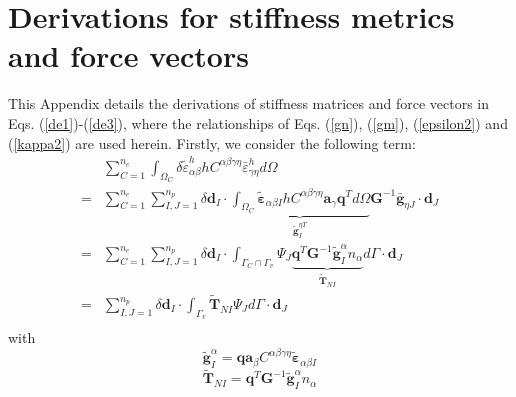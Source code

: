 \section{Derivations for stiffness metrics and force vectors}
This Appendix details the derivations of stiffness matrices and force vectors in Eqs. (\ref{de1})-(\ref{de3}), where the relationships of Eqs. (\ref{gn}), (\ref{gm}), (\ref{epsilon2}) and (\ref{kappa2}) are used herein. Firstly, we consider the following term:
\begin{equation}
\begin{split}
&\sum_{C=1}^{n_e}\int_{\Omega_C} \delta \tilde \varepsilon_{\alpha\beta}^h hC^{\alpha\beta\gamma\eta}\bar \varepsilon^h_{\gamma\eta} d\Omega \\
        =&\sum_{C=1}^{n_e}\sum_{I,J=1}^{n_p}\delta \boldsymbol d_I \cdot \underbrace{\int_{\Omega_C} \tilde{\boldsymbol \varepsilon}_{\alpha\beta I} hC^{\alpha\beta\gamma\eta} \boldsymbol a_\gamma \boldsymbol q^T d\Omega}_{\tilde{\boldsymbol g}^{\eta T}_I} \boldsymbol G^{-1} \bar{\boldsymbol g}_{\eta J} \cdot \boldsymbol d_J \\
        =&\sum_{C=1}^{n_e}\sum_{I,J=1}^{n_p}\delta \boldsymbol d_I \cdot \int_{\Gamma_C\cap\Gamma_v} \Psi_J \underbrace{\boldsymbol q^T \boldsymbol G^{-1}\tilde{\boldsymbol g}^\alpha_I
        n_\alpha}_{\tilde{\boldsymbol T}_{NI}} d\Gamma
       \cdot \boldsymbol d_J \\
        =&\sum_{I,J=1}^{n_p}\delta \boldsymbol d_I \cdot \int_{\Gamma_v} \tilde{\boldsymbol T}_{NI}\Psi_J d\Gamma
       \cdot \boldsymbol d_J \\
\end{split}
\end{equation}
with
\begin{equation}
        \tilde{\boldsymbol g}^\alpha_I = \boldsymbol q \boldsymbol a_\beta C^{\alpha\beta\gamma\eta} \tilde{\boldsymbol \varepsilon}_{\alpha\beta I}
\end{equation}
\begin{equation}
        \tilde{\boldsymbol T}_{NI} = \boldsymbol q^T \boldsymbol G^{-1} \tilde{\boldsymbol g}_I^\alpha n_\alpha
\end{equation}
